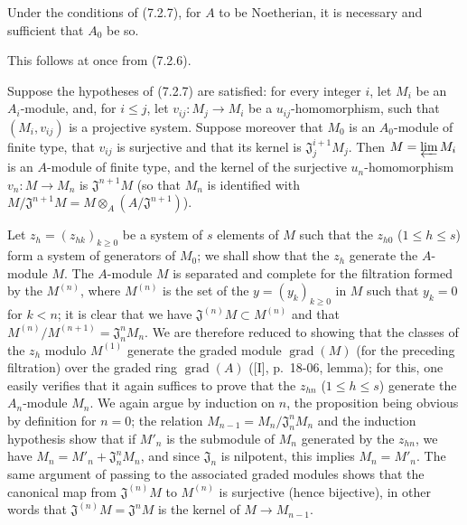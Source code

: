 \begin{corollary}[7.2.8]
\label{0.7.2.8}
Under the conditions of (7.2.7), for $A$ to be Noetherian, it is necessary and
sufficient that $A_0$ be so.
\end{corollary}

This follows at once from (7.2.6).

\begin{proposition}[7.2.9]
\label{0.7.2.9}
Suppose the hypotheses of (7.2.7) are satisfied: for every integer $i$, let
$M_i$ be an $A_i$-module, and, for $i\leq j$, let
$v_{ij}:M_j\to M_i$ be a $u_{ij}$-homomorphism, such that $(M_i,v_{ij})$ is a
projective system. Suppose moreover that $M_0$ is an $A_0$-module of finite
type, that $v_{ij}$ is surjective and that its kernel is
$\mathfrak J_j^{i+1}M_j$. Then $M=\varprojlim M_i$ is an $A$-module of finite
type, and the kernel of the surjective $u_n$-homomorphism $v_n:M\to M_n$ is
$\mathfrak J^{n+1}M$ (so that $M_n$ is identified with
$M/\mathfrak J^{n+1}M=M\otimes_A(A/\mathfrak J^{n+1})$).
\end{proposition}

Let $z_h=(z_{hk})_{k\geq0}$ be a system of $s$ elements of $M$ such that the
$z_{h0}$ ($1\leq h\leq s$) form a system of generators of $M_0$; we shall
show that the $z_h$ generate the $A$-module $M$. The $A$-module $M$ is
separated and complete for the filtration formed by the $M^{(n)}$, where $M^{(n)}$
is the set of the $y=(y_k)_{k\geq0}$ in $M$ such that $y_k=0$ for $k<n$;
it is clear that we have $\mathfrak J^{(n)}M\subset M^{(n)}$ and that
$M^{(n)}/M^{(n+1)}=\mathfrak J_n^nM_n$. We are therefore reduced to showing that the
classes of the $z_h$ modulo $M^{(1)}$ generate the graded module
$\operatorname{grad}(M)$ (for the preceding filtration) over the graded ring
$\operatorname{grad}(A)$ ([I], p.~18-06, lemma); for this, one easily
verifies that it again suffices to prove that the $z_{hn}$ ($1\leq h\leq s$)
generate the $A_n$-module $M_n$. We again argue by induction on
$n$, the proposition being obvious by definition for $n=0$; the relation
$M_{n-1}=M_n/\mathfrak J_n^nM_n$ and the induction hypothesis show that if
$M'_n$ is the submodule of $M_n$ generated by the $z_{hn}$, we have
$M_n=M'_n+\mathfrak J_n^nM_n$, and since $\mathfrak J_n$ is nilpotent, this
implies $M_n=M'_n$. The same argument of passing to the associated graded modules
shows that the canonical map from $\mathfrak J^{(n)}M$ to
$M^{(n)}$ is surjective (hence bijective), in other words that
$\mathfrak J^{(n)}M=\mathfrak J^nM$ is the kernel of $M\to M_{n-1}$.

